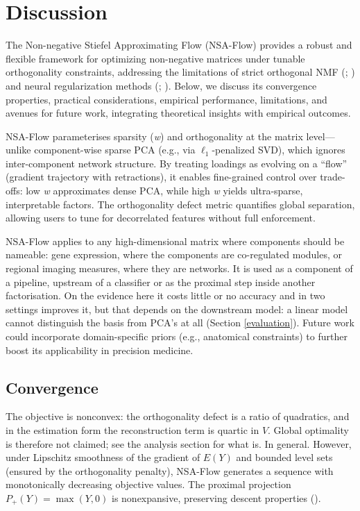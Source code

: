 \documentclass[
]{article}
\begin{document}
\section{Discussion}\label{discussion}

The Non-negative Stiefel Approximating Flow (NSA-Flow) provides a robust and flexible framework for optimizing non-negative matrices under tunable orthogonality constraints, addressing the limitations of strict orthogonal NMF (; ) and neural regularization methods (; ). Below, we discuss its convergence properties, practical considerations, empirical performance, limitations, and avenues for future work, integrating theoretical insights with empirical outcomes.

NSA-Flow parameterises sparsity (\emph{w}) and orthogonality at the matrix level---unlike component-wise sparse PCA (e.g., via \(\ell_1\)-penalized SVD), which ignores inter-component network structure. By treating loadings as evolving on a ``flow'' (gradient trajectory with retractions), it enables fine-grained control over trade-offs: low \emph{w} approximates dense PCA, while high \emph{w} yields ultra-sparse, interpretable factors. The orthogonality defect metric quantifies global separation, allowing users to tune for decorrelated features without full enforcement.

NSA-Flow applies to any high-dimensional matrix where components should be nameable: gene expression, where the components are co-regulated modules, or regional imaging measures, where they are networks. It is used as a component of a pipeline, upstream of a classifier or as the proximal step inside another factorisation. On the evidence here it costs little or no accuracy and in two settings improves it, but that depends on the downstream model: a linear model cannot distinguish the basis from PCA's at all (Section \ref{evaluation}). Future work could incorporate domain-specific priors (e.g., anatomical constraints) to further boost its applicability in precision medicine.

\subsection{Convergence}\label{convergence}

The objective is nonconvex: the orthogonality defect is a ratio of quadratics, and in the estimation form the reconstruction term is quartic in \(V\). Global optimality is therefore not claimed; see the analysis section for what is. In general. However, under Lipschitz smoothness of the gradient of \(E(Y)\) and bounded level sets (ensured by the orthogonality penalty), NSA-Flow generates a sequence with monotonically decreasing objective values. The proximal projection \(P_+(Y) = \max(Y, 0)\) is nonexpansive, preserving descent properties ().
\end{document}
